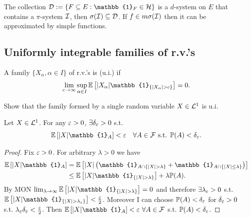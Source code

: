 \begin{remark}
    The collection $\mc{D} := \{ F \subseteq E : \mathbb{1}_F \in \mc{H} \}$ is a $d$-system on $E$ that contains a $\pi$-system $\mathcal{I}$, then $\sigma(\mathcal{I}) \subseteq \mathcal{D}$.
    If $f \in m\sigma(\mathcal{I})$ then it can be approximated by simple functions.
\end{remark}

\subsection{Uniformly integrable families of r.v.'s}

\begin{definition}
    A family $\{X_\alpha, \alpha \in I\}$ of r.v.'s is  (u.i.) if
    \[ \lim_{c \to \infty} \sup_{\alpha \in I} \EE \left[ |X_\alpha| \mathbb{1}_{\{|X_\alpha| > c\}} \right] = 0. \]
\end{definition}

\begin{homework}
    Show that the family formed by a single random variable $X \in \mathcal{L}^1$ is u.i.
\end{homework}

\begin{lemma} \label{lem:ui_eps_delta}
    Let $X \in \mathcal{L}^1$. For any $\varepsilon > 0$, $\exists \delta_\varepsilon > 0$ s.t.
    \[ \EE \left[ |X| \mathbb{1}_A \right] < \eps \quad \forall A \in \mc{F} \text{ s.t. } \PP(A) < \delta_\eps. \]
\end{lemma}

\begin{proof}
    Fix $\varepsilon > 0$. For arbitrary $\lambda > 0$ we have
    \begin{align*}
        \EE \left[ |X| \mathbb{1}_A \right] &= \EE \left[ |X| \paren{\mathbb{1}_{A \cap \{|X| > \lambda\}} + \mathbb{1}_{A \cap \{|X| \leq \lambda\}}} \right] \\
        &\leq \EE \left[ |X| \mathbb{1}_{\{|X| > \lambda\}} \right] + \lambda \PP(A).
    \end{align*}
    By MON $\lim_{\lambda \to \infty} \EE \left[ |X| \mathbb{1}_{\{|X| > \lambda\}} \right] = 0$ and therefore $\exists \lambda_\varepsilon > 0$ s.t. $\EE \left[ |X| \mathbb{1}_{\{|X| > \lambda_\eps\}} \right] < \frac{\eps}{2}$. Moreover I can choose $\mathbb P(A) < \delta_\varepsilon$ for $\delta_\varepsilon > 0$ s.t. $\lambda_\varepsilon \delta_\varepsilon < \frac{\varepsilon}{2}$. Then $\EE \left[ |X| \mathbb{1}_A \right] < \eps \ \forall A \in \mc{F}$ s.t. $\mathbb P(A) < \delta_\varepsilon$.
\end{proof}

